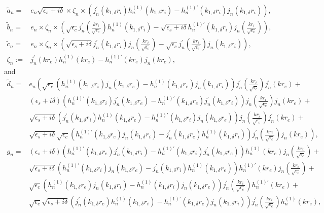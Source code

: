 \documentclass[11pt,reqno,twoside]{amsart}
\theoremstyle{definition}
\theoremstyle{remark}
\numberwithin{equation}{section}
\begin{document}
\begin{align}
\tilde{a}_n= & e_n \sqrt{\epsilon_s+i\delta}\times \zeta_n \times \left(j_n^{\prime}(k_{1,\delta}r_i) h_n^{(1)}(k_{1,\delta}r_i) - h_n^{(1)\prime}(k_{1,\delta}r_i)j_n(k_{1,\delta}r_i)\right),\\
    \tilde{b}_n= & e_n \times\zeta_n \times \left(\sqrt{\epsilon_c}j_n^{\prime}(\frac{kr_i}{\sqrt{\epsilon_c}}) h_n^{(1)}(k_{1,\delta}r_i) - \sqrt{\epsilon_s+i\delta} h_n^{(1)\prime}(k_{1,\delta}r_i)j_n(\frac{kr_i}{\sqrt{\epsilon_c}})\right),\\
    \tilde{c}_n= & e_n \times \zeta_n \times \left(\sqrt{\epsilon_s+i\delta} j_n^{\prime}(k_{1,\delta}r_i)j_n(\frac{kr_i}{\sqrt{\epsilon_c}}) - \sqrt{\epsilon_c}j_n^{\prime}(\frac{kr_i}{\sqrt{\epsilon_c}}) j_n(k_{1,\delta}r_i) \right),\\
   \zeta_n:= &  j_n^{\prime}(kr_e) h_n^{(1)}(kr_e) - h_n^{(1)\prime}(kr_e)j_n(kr_e),
   \end{align}
 and
 \begin{align}
 \tilde{d}_n= &e_n \left( \sqrt{\epsilon_c} \left(h_n^{(1)}(k_{1,\delta}r_i)j_n(k_{1,\delta}r_e)- h_n^{(1)}(k_{1,\delta}r_e)j_n(k_{1,\delta}r_i)\right) j_n^{\prime}(\frac{kr_i}{\sqrt{\epsilon_c}})j_n^{\prime}(kr_e) + \right.\nonumber \\
    & (\epsilon_s+i\delta)\left( h_n^{(1)\prime}(k_{1,\delta}r_i)j_n^{\prime}(k_{1,\delta}r_e) -h_n^{(1)\prime}(k_{1,\delta}r_e)j_n^{\prime}(k_{1,\delta}r_i) \right) j_n(\frac{kr_i}{\sqrt{\epsilon_c}})j_n(kr_e) + \nonumber\\
    & \sqrt{\epsilon_s+i\delta}\left( j_n^{\prime}(k_{1,\delta}r_i)h_n^{(1)}(k_{1,\delta}r_e) - h_n^{(1)\prime}(k_{1,\delta}r_i)j_n(k_{1,\delta}r_e) \right) j_n(\frac{kr_i}{\sqrt{\epsilon_c}})j_n^{\prime}(kr_e) +\nonumber \\
    & \left. \sqrt{\epsilon_s+i\delta}\sqrt{\epsilon_c} \left( h_n^{(1)\prime}(k_{1,\delta}r_e)j_n(k_{1,\delta}r_i) - j_n^{\prime}(k_{1,\delta}r_e)h_n^{(1)}(k_{1,\delta}r_i)\right) j_n^{\prime}(\frac{kr_i}{\sqrt{\epsilon_c}})j_n(kr_e) \right),
 \end{align}
 \begin{align}
  g_n = & (\epsilon_s+i\delta)\left( h_n^{(1)\prime}(k_{1,\delta}r_e)j_n^{\prime}(k_{1,\delta}r_i) -h_n^{(1)\prime}(k_{1,\delta}r_i)j_n^{\prime}(k_{1,\delta}r_e) \right)h_n^{(1)}(kr_e) j_n(\frac{kr_i}{\sqrt{\epsilon_c}}) +\nonumber  \\
      & \sqrt{\epsilon_s+i\delta}\left(h_n^{(1)\prime}(k_{1,\delta}r_i)j_n(k_{1,\delta}r_e)  -j_n^{\prime}(k_{1,\delta}r_i) h_n^{(1)}(k_{1,\delta}r_e) \right)h_n^{(1)\prime}(kr_e) j_n(\frac{kr_i}{\sqrt{\epsilon_c}}) +\nonumber \\
      & \sqrt{\epsilon_c}\left( h_n^{(1)}(k_{1,\delta}r_e)j_n(k_{1,\delta}r_i) -h_n^{(1)}(k_{1,\delta}r_i)j_n(k_{1,\delta}r_e) \right)j_n^{\prime}(\frac{kr_i}{\sqrt{\epsilon_c}})h_n^{(1)\prime}(kr_e) +\nonumber \\
      &  \sqrt{\epsilon_c}\sqrt{\epsilon_s+i\delta}\left( j_n^{\prime}(k_{1,\delta}r_e) h_n^{(1)}(k_{1,\delta}r_i) - h_n^{(1)\prime}(k_{1,\delta}r_e)j_n(k_{1,\delta}r_i)    \right) j_n^{\prime}(\frac{kr_i}{\sqrt{\epsilon_c}})h_n^{(1)}(kr_e),\label{eq:2.29}
 \end{align}
\end{document}
